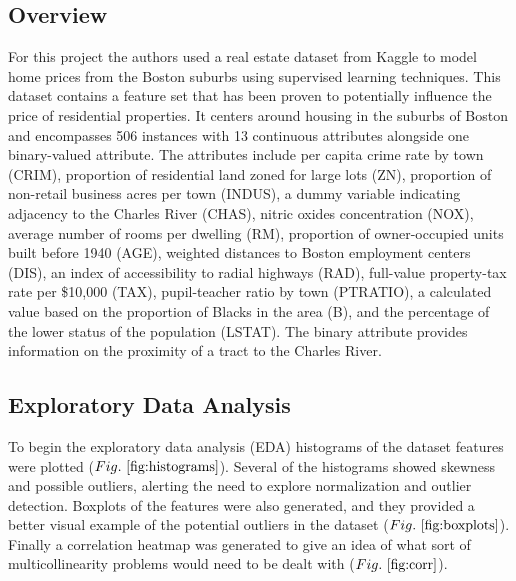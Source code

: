 \documentclass[conference, 11pt]{IEEEtran}
\begin{document}
\subsection{Overview}
For this project the authors used a real estate dataset from Kaggle to model home prices from the Boston suburbs using supervised learning techniques. This dataset contains a feature set that has been proven to potentially influence the price of residential properties. It centers around housing in the suburbs of Boston and encompasses 506 instances with 13 continuous attributes alongside one binary-valued attribute. The attributes include per capita crime rate by town (CRIM), proportion of residential land zoned for large lots (ZN), proportion of non-retail business acres per town (INDUS), a dummy variable indicating adjacency to the Charles River (CHAS), nitric oxides concentration (NOX), average number of rooms per dwelling (RM), proportion of owner-occupied units built before 1940 (AGE), weighted distances to Boston employment centers (DIS), an index of accessibility to radial highways (RAD), full-value property-tax rate per \$10,000 (TAX), pupil-teacher ratio by town (PTRATIO), a calculated value based on the proportion of Blacks in the area (B), and the percentage of the lower status of the population (LSTAT). The binary attribute provides information on the proximity of a tract to the Charles River.

\subsection{Exploratory Data Analysis}

To begin the exploratory data analysis (EDA) histograms of the dataset features were plotted ($Fig.
~\ref{fig:histograms}$). Several of the histograms showed skewness and possible outliers, alerting the need to explore normalization and outlier detection. Boxplots of the features were also generated, and they provided a better visual example of the potential outliers in the dataset ($Fig.~\ref{fig:boxplots}$). Finally a correlation heatmap was generated to give an idea of what sort of multicollinearity problems would need to be dealt with ($Fig.~\ref{fig:corr}$).
\end{document}
